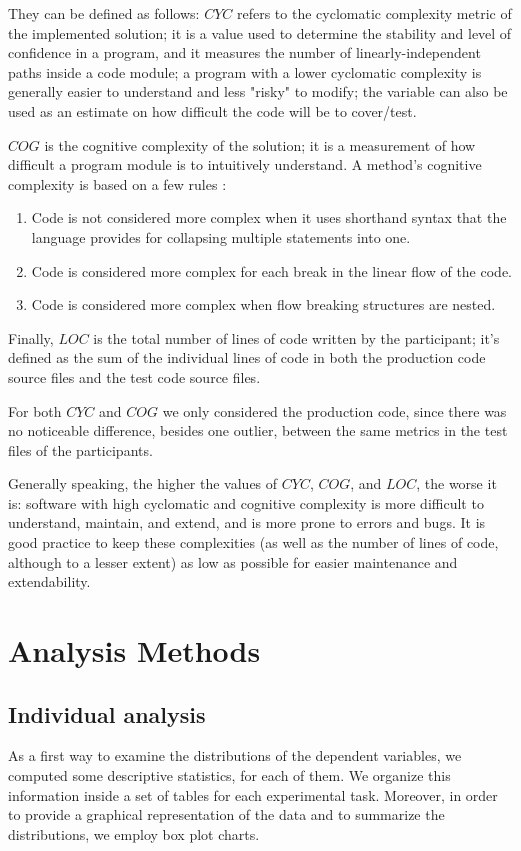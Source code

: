 They can be defined as follows:
\textbf{$CYC$} refers to the cyclomatic complexity metric of the implemented solution; it is a value used to determine the stability and level of confidence in a program, and it measures the number of linearly-independent paths inside a code module; a program with a lower cyclomatic complexity is generally easier to understand and less "risky" to modify; the variable can also be used as an estimate on how difficult the code will be to cover/test.

\textbf{$COG$} is the cognitive complexity of the solution; it is a measurement of how difficult a program module is to intuitively understand. A method's cognitive complexity is based on a few rules \cite{CognitiveComplexity}:
\begin{enumerate}
    \item Code is not considered more complex when it uses shorthand syntax that the language provides for collapsing multiple statements into one.
    \item Code is considered more complex for each break in the linear flow of the code.
    \item Code is considered more complex when flow breaking structures are nested.
\end{enumerate}

Finally, $LOC$ is the total number of lines of code written by the participant; it's defined as the sum of the individual lines of code in both the production code source files and the test code source files.

For both $CYC$ and $COG$ we only considered the production code, since there was no noticeable difference, besides one outlier, between the same metrics in the test files of the participants.

Generally speaking, the higher the values of $CYC$, $COG$, and $LOC$, the worse it is: software with high cyclomatic and cognitive complexity is more difficult to understand, maintain, and extend, and is more prone to errors and bugs. It is good practice to keep these complexities (as well as the number of lines of code, although to a lesser extent) as low as possible for easier maintenance and extendability.





\section{Analysis Methods}
\subsection{Individual analysis}
As a first way to examine the distributions of the dependent variables, we computed some descriptive statistics, for each of them. We organize this information inside a set of tables for each experimental task. Moreover, in order to provide a graphical representation of the data and to summarize the distributions, we employ box plot charts.

